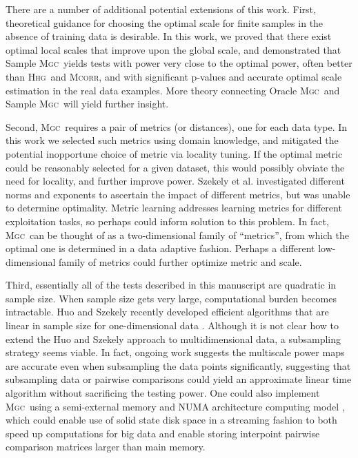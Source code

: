 \documentclass[11pt]{article}
\providecommand{\sct}[1]{{\normalfont\textsc{#1}}}
\newcommand{\Mgc}{\sct{Mgc}}
\newcommand{\Hhg}{\sct{Hhg}}
\newcommand{\Mcorr}{\sct{Mcorr}}
\begin{document}
There are a number of additional potential extensions of this work. First, theoretical guidance for choosing the optimal scale for finite samples in the absence of training data is desirable. 
In this work, we proved that there exist optimal local scales that improve upon the global scale, and demonstrated that Sample \Mgc~yields tests with power very close to the optimal power, often better than \Hhg~and \Mcorr, and with significant p-values and accurate optimal scale estimation in the real data examples. More theory connecting Oracle \Mgc~and  Sample \Mgc~will yield further insight.

Second, \Mgc~requires a pair of metrics (or distances), one for each data type. In this work we selected such metrics using domain knowledge, and mitigated the potential inopportune choice of metric via locality tuning.  If the optimal metric could be reasonably selected for a given dataset, this would possibly obviate the need for locality, and further improve power. Szekely et al. investigated different norms and exponents to ascertain the impact of different metrics, but was unable to determine optimality.
Metric learning \cite{xing2003distance} addresses learning metrics for different exploitation tasks, so perhaps could inform solution to this problem.
In fact, \Mgc~can be thought of as a two-dimensional family of ``metrics'', from which the optimal one is determined in a data adaptive fashion.  Perhaps a different low-dimensional family of metrics could further optimize metric and scale.

Third, essentially all of the tests described in this manuscript are quadratic in sample size.  When sample size gets very large, computational burden becomes intractable. Huo and Szekely  recently developed efficient algorithms that are linear in sample size for one-dimensional data \cite{Huo2016}.  Although it is not clear how to extend the Huo and Szekely approach to multidimensional data, a subsampling strategy seems viable. In fact, ongoing work suggests the multiscale power maps are accurate even when subsampling the data points significantly, suggesting that subsampling data or pairwise comparisons could yield an approximate linear time algorithm without sacrificing the testing power.  One could also implement \Mgc~using a semi-external memory and NUMA architecture computing model \cite{Zheng2016},  which could enable use of solid state disk space in a streaming fashion to both speed up computations for big data and enable storing interpoint pairwise comparison matrices larger than main memory.
\end{document}
